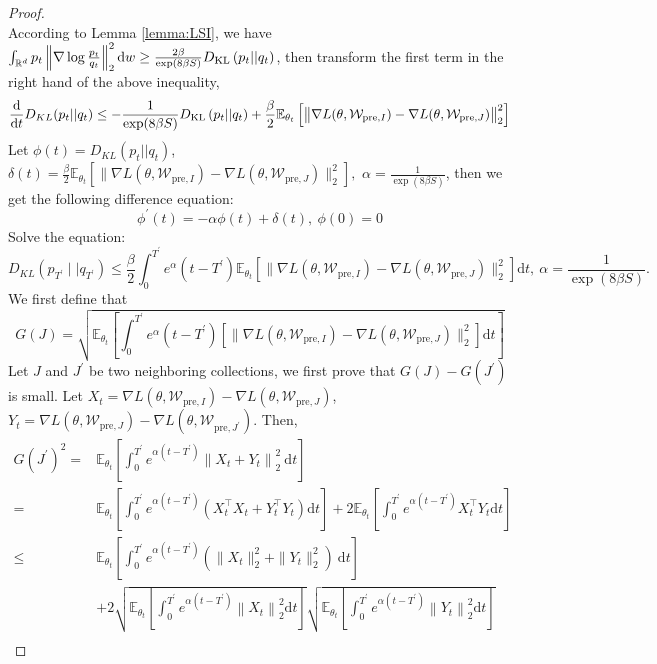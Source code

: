 \begin{proof}
$$	$$
	According to Lemma \ref{lemma:LSI}, we have $\int_{\mathbb{R}^d}p_t\left\|\nabla\log\frac{p_t}{q_t}\right\|_2^2\mathrm{d}w \geq \frac{2\beta}{\exp(8\beta S)}\KL\left(p_t||q_t\right)$, then transform the first term in the right hand of the above inequality,
	$$
	\frac{\mathrm{d}}{\mathrm{d}t}D_{KL}(p_t||q_t) \leq -\frac{1}{\exp(8\beta S)}\KL\left(p_t||q_t\right)+\frac{\beta}{2}\mathbb{E}_{\theta_t}\left[\big\|\nabla L(\theta, \mathcal{W}_{\text{pre},I})-\nabla L(\theta, \mathcal{W}_{\text{pre},J})\big\|^2_2\right]
	$$
	Let $\phi(t)=D_{KL}(p_t||q_t)$, $\delta(t)=\frac{\beta}{2}\mathbb{E}_{\theta_t}\left[\big\|\nabla L(\theta, \mathcal{W}_{\text{pre},I})-\nabla L(\theta, \mathcal{W}_{\text{pre},J})\big\|^2_2\right],$ $\alpha=\frac{1}{\exp(8\beta S)}$, then we get the following difference equation:
	$$
	\phi^{\prime}(t) = -\alpha \phi(t) + \delta(t),\ \phi(0)=0
	$$
	Solve the equation:
	\small{
    $$
	D_{KL}\left(p_{T^\prime}\mid\mid q_{T^\prime}\right)\leq\frac\beta2\int_0^{T^\prime}e^\alpha(t-{T^\prime})\mathbb{E}_{\theta_t}\left[\big\|\nabla L(\theta, \mathcal{W}_{\text{pre},I})-\nabla L(\theta, \mathcal{W}_{\text{pre},J})\big\|_2^2\right]\mathrm{d}t,\ \alpha=\frac{1}{\exp(8\beta S)}.
	$$
    }
	We first define that
	$$
	G(J) = \sqrt{\mathbb{E}_{\theta_t}\left[\int_0^{T^\prime} e^\alpha(t-{T^\prime})\left[\big\|\nabla L(\theta, \mathcal{W}_{\text{pre},I})-\nabla L(\theta, \mathcal{W}_{\text{pre},J})\big\|_2^2\right]\mathrm{d}t\right]}
	$$
	Let $J$ and $J^{\prime}$ be two neighboring collections, we first prove that $G(J)-G(J^{\prime})$ is small. Let $X_t=\nabla L(\theta, \mathcal{W}_{\text{pre},I})-\nabla L(\theta, \mathcal{W}_{\text{pre},J})$, $Y_t=\nabla L(\theta, \mathcal{W}_{\text{pre},J})-\nabla L(\theta, \mathcal{W}_{\text{pre},J^{\prime}})$. Then,
	$$
	\begin{aligned}
		G(J^{\prime})^{2} =&\mathbb{E}_{\theta_t}\left[\int_0^{T^\prime}e^{\alpha(t-{T^\prime})}\left\|X_t+Y_t\right\|_2^2\mathrm{~d}t\right]  \\
		=&\mathbb{E}_{\theta_t}\left[\int_0^{T^\prime}e^{\alpha(t-{T^\prime})}\left(X_t^\top X_t+Y_t^\top Y_t\right)\mathrm{d}t\right]+2\mathbb{E}_{\theta_t}\left[\int_0^{T^\prime}e^{\alpha(t-{T^\prime})}X_t^\top Y_t\mathrm{d}t\right] \\
		\leq&\mathbb{E}_{\theta_t}\left[\int_0^{T^\prime}e^{\alpha(t-{T^\prime})}\left(\|X_t\|_2^2+\|Y_t\|_2^2\right)\mathrm{~d}t\right]\\
		&+2\sqrt{\mathbb{E}_{\theta_t}\left[\int_{0}^{{T^\prime}}e^{\alpha(t-{T^\prime})}\left\|X_{t}\right\|_{2}^{2}\mathrm{d}t\right]}\sqrt{\mathbb{E}_{\theta_t}\left[\int_{0}^{{T^\prime}}e^{\alpha(t-{T^\prime})}\left\|Y_{t}\right\|_{2}^{2}\mathrm{d}t\right]} \\

\end{aligned}$$
\end{proof}
